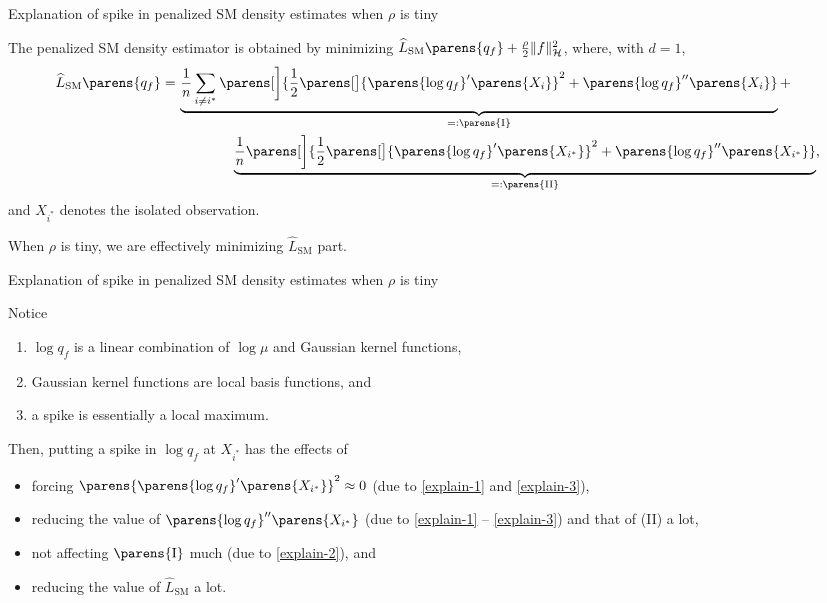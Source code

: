 \documentclass[aspectratio=169,xcolor=dvipsnames]{beamer}
\newcommand{\SM}{\mathrm{SM}}
\begin{document}
\begin{frame}{Explanation of spike in penalized SM density estimates when $\rho$ is tiny}
	
	The penalized SM density estimator is obtained by minimizing $\widehat{L}_{\SM} \parens{q_f} + \frac{\rho}{2} \Vert f \Vert_{\mathcal{H}}^2$, where, with $d = 1$, 
	\begin{align}
		\widehat{L}_{\SM} \parens{q_f} = & \, \underbrace{\frac{1}{n} \sum_{i \neq i^*} \parens[\bigg]{\frac{1}{2} \parens[\big]{ \parens{\log q_f}' \parens{X_i}}^2 + \parens{\log q_f}'' \parens{X_i}}}_{=: \parens{\mathrm{I}}} + \nonumber \\ 
		& \qquad \qquad \underbrace{\frac{1}{n} \parens[\bigg]{\frac{1}{2} \parens[\big]{ \parens{\log q_f}' \parens{X_{i^*}}}^2 + \parens{\log q_f}'' \parens{X_{i^*}}}}_{=: \parens{\mathrm{II}}}, 
	\end{align}
	and $X_{i^*}$ denotes the isolated observation. 
	
	\vspace{5pt}
	
	When $\rho$ is tiny, we are effectively minimizing $\widehat{L}_{\SM}$ part. 
	
\end{frame}


\begin{frame}{Explanation of spike in penalized SM density estimates when $\rho$ is tiny}
	
	Notice 
	\begin{enumerate}
		\item $\log q_f$ is a linear combination of $\log \mu$ and Gaussian kernel functions, \label{explain-1}
		\item Gaussian kernel functions are local basis functions, and \label{explain-2}
		\item a spike is essentially a local maximum. \label{explain-3}
	\end{enumerate}
	
	\vspace{10pt}
	
	Then, putting a spike in $\log q_f$ at $X_{i^*}$ has the effects of 
	\begin{itemize}
		\item forcing $\parens{\parens{\log q_f}' \parens{X_{i^*}}}^2 \approx 0$ (due to \ref{explain-1} and \ref{explain-3}), 
		\item reducing the value of $\parens{\log q_f}'' \parens{X_{i^*}}$ (due to \ref{explain-1} -- \ref{explain-3}) and that of (II) a lot, 
		\item not affecting $\parens{\mathrm{I}}$ much (due to \ref{explain-2}), and 
		\item reducing the value of $\widehat{L}_{\SM}$ a lot. 
	\end{itemize}
	
\end{frame}
\end{document}
